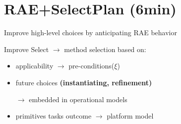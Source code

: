 \section{RAE+SelectPlan (6min)}
\begin{frame}{Improve high-level choices by anticipating RAE behavior}

    Improve Select $\rightarrow$ method selection based on:
    \begin{itemize}
        \item applicability $\rightarrow$ pre-conditions($\xi$)
        \item future choices \textbf{(instantiating, refinement)}
        
        $\rightarrow$ embedded in operational models
        \item primitives tasks outcome $\rightarrow$ platform model
    \end{itemize}

\end{frame}
